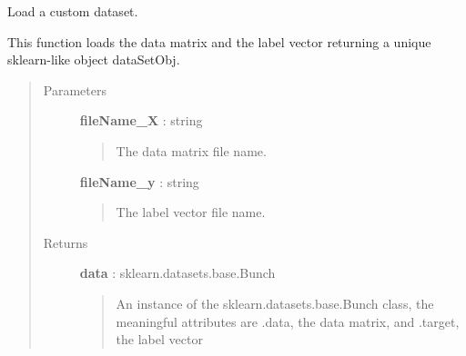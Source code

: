 \documentclass[letterpaper,10pt,english]{sphinxmanual}
\begin{document}
\begin{fulllineitems}
\label{index:adenine.utils.data_source.load_custom}
Load a custom dataset.

This function loads the data matrix and the label vector returning a unique sklearn-like object dataSetObj.
\begin{quote}\begin{description}
\item[{Parameters}] \leavevmode
\textbf{fileName\_X} : string
\begin{quote}

The data matrix file name.
\end{quote}

\textbf{fileName\_y} : string
\begin{quote}

The label vector file name.
\end{quote}

\item[{Returns}] \leavevmode
\textbf{data} : sklearn.datasets.base.Bunch
\begin{quote}

An instance of the sklearn.datasets.base.Bunch class, the meaningful attributes are .data, the data matrix, and .target, the label vector
\end{quote}

\end{description}\end{quote}

\end{fulllineitems}

\end{document}
